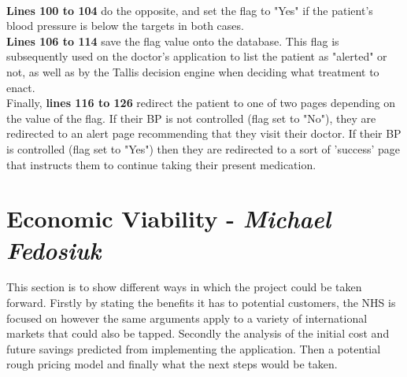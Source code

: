 \documentclass[11pt]{article}
\begin{document}
\\
\textbf{Lines 100 to 104} do the opposite, and set the flag to "Yes" if the patient's blood pressure is below the targets in both cases.
\\
\textbf{Lines 106 to 114} save the flag value onto the database. This flag is subsequently used on the doctor's application to list the patient as "alerted" or not, as well as by the Tallis decision engine when deciding what treatment to enact.
\\
Finally, \textbf{lines 116 to 126} redirect the patient to one of two pages depending on the value of the flag. If their BP is not controlled (flag set to "No"), they are redirected to an alert page recommending that they visit their doctor. If their BP is controlled (flag set to "Yes") then they are redirected to a sort of 'success' page that instructs them to continue taking their present medication.


\section{Economic Viability - \textit{Michael Fedosiuk}}
This section is to show different ways in which the project could be taken forward. Firstly by stating the benefits it has to potential customers, the NHS is focused on however the same arguments apply to a variety of international markets that could also be tapped. Secondly the analysis of the initial cost and future savings predicted from implementing the application. Then a potential rough pricing model and finally what the next steps would be taken.
\end{document}
